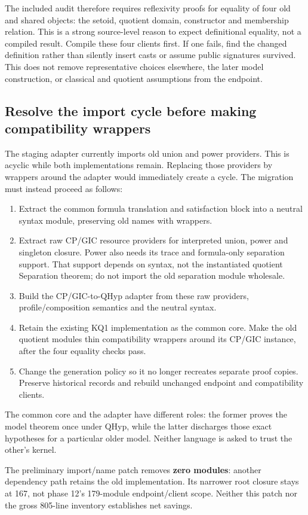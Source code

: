 \documentclass[11pt]{article}
\begin{document}
The included audit therefore requires reflexivity proofs for equality of four old and shared objects: the setoid, quotient domain, constructor and membership relation. This is a strong source-level reason to expect definitional equality, not a compiled result. Compile these four clients first. If one fails, find the changed definition rather than silently insert casts or assume public signatures survived. This does not remove representative choices elsewhere, the later model construction, or classical and quotient assumptions from the endpoint.

\subsection{Resolve the import cycle before making compatibility wrappers}
The staging adapter currently imports old union and power providers. This is acyclic while both implementations remain. Replacing those providers by wrappers around the adapter would immediately create a cycle. The migration must instead proceed as follows:
\begin{enumerate}
\item Extract the common formula translation and satisfaction block into a neutral syntax module, preserving old names with wrappers.
\item Extract raw CP/GIC resource providers for interpreted union, power and singleton closure. Power also needs its trace and formula-only separation support. That support depends on syntax, not the instantiated quotient Separation theorem; do not import the old separation module wholesale.
\item Build the CP/GIC-to-QHyp adapter from these raw providers, profile/composition semantics and the neutral syntax.
\item Retain the existing KQ1 implementation as the common core. Make the old quotient modules thin compatibility wrappers around its CP/GIC instance, after the four equality checks pass.
\item Change the generation policy so it no longer recreates separate proof copies. Preserve historical records and rebuild unchanged endpoint and compatibility clients.
\end{enumerate}
The common core and the adapter have different roles: the former proves the model theorem once under QHyp, while the latter discharges those exact hypotheses for a particular older model. Neither language is asked to trust the other's kernel.

The preliminary import/name patch removes \textbf{zero modules}: another dependency path retains the old implementation. Its narrower root closure stays at 167, not phase 12's 179-module endpoint/client scope. Neither this patch nor the gross 805-line inventory establishes net savings.
\end{document}
